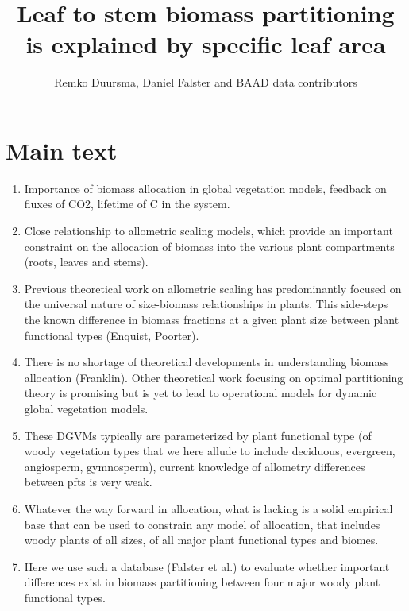 \documentclass[a4paper]{article}
\begin{document}
\title{Leaf to stem biomass partitioning is explained by specific leaf area}

\author{Remko Duursma, Daniel Falster and BAAD data contributors}

\maketitle



\section{Main text}

\begin{enumerate}
  \item Importance of biomass allocation in global vegetation models, feedback on fluxes of CO2, lifetime of C in the system. 
  \item Close relationship to allometric scaling models, which provide an important constraint on the allocation of biomass into the various plant compartments (roots, leaves and stems).
  \item Previous theoretical work on allometric scaling has predominantly focused on the universal nature of size-biomass relationships in plants. This side-steps the known difference in biomass fractions at a given plant size between plant functional types (Enquist, Poorter).
  \item There is no shortage of theoretical developments in understanding biomass allocation (Franklin). Other theoretical work focusing on optimal partitioning theory is promising but is yet to lead to operational models for dynamic global vegetation models.
  \item These DGVMs typically are parameterized by plant functional type (of woody vegetation types that we here allude to include deciduous, evergreen, angiosperm, gymnosperm), current knowledge of allometry differences between pfts is very weak.
  \item Whatever the way forward in allocation, what is lacking is a solid empirical base that can be used to constrain any model of allocation, that includes woody plants of all sizes, of all major plant functional types and biomes.
  \item Here we use such a database (Falster et al.) to evaluate whether important differences exist in biomass partitioning between four major woody plant functional types.

\end{enumerate}
\end{document}
